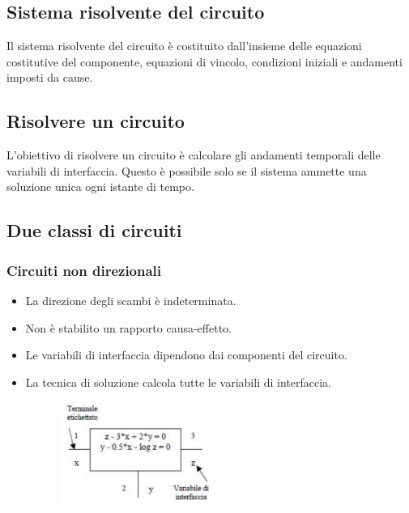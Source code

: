 \subsection*{Sistema risolvente del circuito}
Il sistema risolvente del circuito è costituito dall'insieme delle equazioni costitutive del componente, equazioni di vincolo, condizioni iniziali e andamenti imposti da cause. 

\subsection*{Risolvere un circuito}
L'obiettivo di risolvere un circuito è calcolare gli andamenti temporali delle variabili di interfaccia. 
Questo è possibile solo se il sistema ammette una soluzione unica ogni istante di tempo.

\subsection*{Due classi di circuiti}
\subsubsection*{Circuiti non direzionali}
\begin{itemize}
    \item La direzione degli scambi è indeterminata.
    \item Non è stabilito un rapporto causa-effetto.
    \item Le variabili di interfaccia dipendono dai componenti del circuito.
    \item La tecnica di soluzione calcola tutte le variabili di interfaccia.
    \begin{figure}[H]
        \centering
        \includegraphics[width=0.5\textwidth]{capitoli/capitolo1/immagini/image2.png}
    \end{figure}
\end{itemize}

